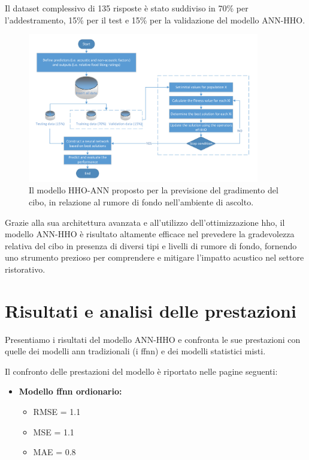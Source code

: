 Il dataset complessivo di 135 risposte è stato suddiviso in 70\% per l'addestramento, 15\% per il test e 15\% per la validazione del modello ANN-HHO.

\begin{figure}[H]
      \centering
      \includegraphics[width=0.9\textwidth]{Chapters/Figures/HHO-ANN.png}
      \caption{Il modello HHO-ANN proposto per la previsione del gradimento del cibo, in relazione al rumore di fondo nell'ambiente di ascolto. \cite{alamir2021enhanced}}
      \label{hho-ann}
\end{figure}

Grazie alla sua architettura avanzata e all'utilizzo dell'ottimizzazione \gls{hho}, il modello ANN-HHO è risultato altamente efficace nel prevedere la gradevolezza relativa del cibo in presenza di diversi tipi e livelli di rumore di fondo, fornendo uno strumento prezioso per comprendere e mitigare l'impatto acustico nel settore ristorativo.

\section{Risultati e analisi delle prestazioni}
\noindent

Presentiamo i risultati del modello ANN-HHO e confronta le sue prestazioni con quelle dei modelli \gls{ann} tradizionali (i \gls{ffnn}) e dei modelli statistici misti.

Il confronto delle prestazioni del modello è riportato nelle pagine seguenti:

\newpage 
\begin{itemize}
      \item \textbf{Modello \gls{ffnn} ordionario:}
            \begin{itemize}
                  \item RMSE = 1.1
                  \item MSE = 1.1
                   \item MAE = 0.8
            \end{itemize}       
\end{itemize}

